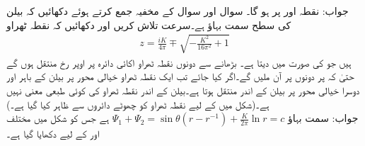 جواب:\quad
نقطہ  اور  پر  ہو گا۔
\quad {}\quad
سوال  اور سوال  کے مخفیہ جمع کرتے ہوئے دکھائیں کہ بیلن کی سطح  سمت بہاؤ ہے۔سرعت تلاش کریں اور دکھائیں کہ نقطہ ٹھراو
\begin{align*}
z=\frac{iK}{4\pi}\mp \sqrt{-\frac{K^2}{16\pi^2}+1}
\end{align*}
ہیں جو  کی صورت میں  دیتا ہے۔ بڑھانے سے دونوں نقطہ ٹھراو اکائی دائرہ پر اوپر رخ منتقل ہوں گے  حتیٰ کہ  پر دونوں  پر آن ملیں گے۔اگر   کیا جائے تب ایک نقطہ ٹھراو خیالی محور پر بیلن کے باہر اور دوسرا خیالی محور پر بیلن کے اندر منتقل ہوتا ہے۔بیلن کے اندر نقطہ ٹھراو کی کوئی طبعی معنی نہیں ہے۔(شکل  میں  کے لیے نقطہ ٹھراو کو چھوٹے دائروں سے ظاہر کیا گیا ہے۔)\\
جواب:\quad
سمت بہاؤ 
$\Psi_1+\Psi_2=\sin\theta(r-r^{-1})+\tfrac{K}{2\pi}\ln r=c$
ہے جس کو شکل  میں مختلف  اور  کے لیے دکھایا گیا ہے۔
